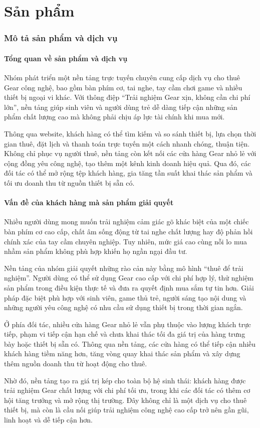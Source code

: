 \part{Sản phẩm}
\section{Mô tả sản phẩm và dịch vụ}

\subsection{Tổng quan về sản phẩm và dịch vụ}
    Nhóm phát triển một nền tảng trực tuyến chuyên cung cấp dịch vụ cho thuê Gear công nghệ, bao gồm bàn phím cơ, tai nghe, tay cầm chơi game và nhiều thiết bị ngoại vi khác. Với thông điệp ``Trải nghiệm Gear xịn, không cần chi phí lớn'', nền tảng giúp sinh viên và người dùng trẻ dễ dàng tiếp cận những sản phẩm chất lượng cao mà không phải chịu áp lực tài chính khi mua mới.

    Thông qua website, khách hàng có thể tìm kiếm và so sánh thiết bị, lựa chọn thời gian thuê, đặt lịch và thanh toán trực tuyến một cách nhanh chóng, thuận tiện. Không chỉ phục vụ người thuê, nền tảng còn kết nối các cửa hàng Gear nhỏ lẻ với cộng đồng yêu công nghệ, tạo thêm một kênh kinh doanh hiệu quả. Qua đó, các đối tác có thể mở rộng tệp khách hàng, gia tăng tần suất khai thác sản phẩm và tối ưu doanh thu từ nguồn thiết bị sẵn có.

\subsection{Vấn đề của khách hàng mà sản phẩm giải quyết}
    Nhiều người dùng mong muốn trải nghiệm cảm giác gõ khác biệt của một chiếc bàn phím cơ cao cấp, chất âm sống động từ tai nghe chất lượng hay độ phản hồi chính xác của tay cầm chuyên nghiệp. Tuy nhiên, mức giá cao cùng nỗi lo mua nhầm sản phẩm không phù hợp khiến họ ngần ngại đầu tư.

    Nền tảng của nhóm giải quyết những rào cản này bằng mô hình ``thuê để trải nghiệm''. Người dùng có thể sử dụng Gear cao cấp với chi phí hợp lý, thử nghiệm sản phẩm trong điều kiện thực tế và đưa ra quyết định mua sắm tự tin hơn. Giải pháp đặc biệt phù hợp với sinh viên, game thủ trẻ, người sáng tạo nội dung và những người yêu công nghệ có nhu cầu sử dụng thiết bị trong thời gian ngắn.

    Ở phía đối tác, nhiều cửa hàng Gear nhỏ lẻ vẫn phụ thuộc vào lượng khách trực tiếp, phạm vi tiếp cận hạn chế và chưa khai thác tối đa giá trị của hàng trưng bày hoặc thiết bị sẵn có. Thông qua nền tảng, các cửa hàng có thể tiếp cận nhiều khách hàng tiềm năng hơn, tăng vòng quay khai thác sản phẩm và xây dựng thêm nguồn doanh thu từ hoạt động cho thuê.

    Nhờ đó, nền tảng tạo ra giá trị kép cho toàn bộ hệ sinh thái: khách hàng được trải nghiệm Gear chất lượng với chi phí tối ưu, trong khi các đối tác có thêm cơ hội tăng trưởng và mở rộng thị trường. Đây không chỉ là một dịch vụ cho thuê thiết bị, mà còn là cầu nối giúp trải nghiệm công nghệ cao cấp trở nên gần gũi, linh hoạt và dễ tiếp cận hơn.